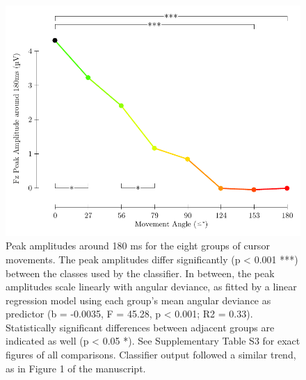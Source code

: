 \begin{figure}[t]
    \renewcommand\thefigure{\ref{chapter:nat}.S7}
    \centering
    \includegraphics[scale=0.775]{figures/nat-app-fig-s7.pdf}
    \caption[Peak amplitudes around 180 ms for eight angular categories of cursor movements.]{Peak amplitudes around 180 ms for the eight groups of cursor movements. The peak amplitudes differ significantly (p < 0.001 ***) between the classes used by the classifier. In between, the peak amplitudes scale linearly with angular deviance, as fitted by a linear regression model using each group's mean angular deviance as predictor (b = -0.0035, F = 45.28, p < 0.001; R2 = 0.33). Statistically significant differences between adjacent groups are indicated as well (p < 0.05 *). See Supplementary Table S3 for exact figures of all comparisons. Classifier output followed a similar trend, as in Figure 1 of the manuscript.}
\end{figure}


